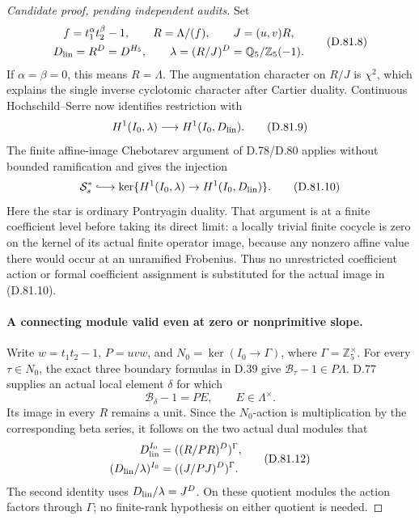 \begin{proof}[Candidate proof, pending independent audits]
Set
\[
 \begin{gathered}
 f=t_1^\alpha t_2^\beta-1,\qquad R=\Lambda/(f),\qquad
 J=(u,v)R,\\
 D_{\rm lin}=R^D=D^{H_5},\qquad
 \lambda=(R/J)^D=\mathbb Q_5/\mathbb Z_5(-1).
 \end{gathered}                                               \tag{D.81.8}
\]
If \(\alpha=\beta=0\), this means \(R=\Lambda\).
The augmentation character on \(R/J\) is \(\chi^2\), which
explains the single inverse cyclotomic character after Cartier duality.
Continuous Hochschild--Serre now identifies restriction with
\[
 H^1(I_0,\lambda)\longrightarrow H^1(I_0,D_{\rm lin}).
                                                               \tag{D.81.9}
\]
The finite affine-image Chebotarev argument of D.78/D.80 applies
without bounded ramification and gives the injection
\[
 \mathcal S_s^*\lhook\joinrel\longrightarrow
 \ker\{H^1(I_0,\lambda)\to H^1(I_0,D_{\rm lin})\}.
                                                               \tag{D.81.10}
\]
Here the star is ordinary Pontryagin duality. That argument is
at a finite coefficient level before taking its direct limit:
a locally trivial finite cocycle is zero on the kernel of its
actual finite operator image, because any nonzero affine value
there would occur at an unramified Frobenius. Thus no unrestricted
coefficient action or formal coefficient assignment is substituted
for the actual image in (D.81.10).

\paragraph{A connecting module valid even at zero or nonprimitive slope.}
Write \(w=t_1t_2-1\), \(P=uvw\), and
\(N_0=\ker(I_0\to\Gamma)\), where \(\Gamma=\mathbb Z_5^\times\).
For every \(\tau\in N_0\), the exact three boundary formulas in
D.39 give
\(\mathcal B_\tau-1\in P\Lambda\).
D.77 supplies an actual local element \(\delta\) for which
\[
              \mathcal B_\delta-1=P E,\qquad
                                  E\in\Lambda^\times. \tag{D.81.11}
\]
Its image in every \(R\) remains a unit. Since the \(N_0\)-action
is multiplication by the corresponding beta series, it follows
on the two actual dual modules that
\[
 \begin{split}
 D_{\rm lin}^{I_0}&=((R/PR)^D)^\Gamma,\\
 (D_{\rm lin}/\lambda)^{I_0}&=((J/PJ)^D)^\Gamma.
 \end{split}                                                 \tag{D.81.12}
\]
The second identity uses \(D_{\rm lin}/\lambda=J^D\).
On these quotient modules the action factors through \(\Gamma\);
no finite-rank hypothesis on either quotient is needed.


\end{proof}
